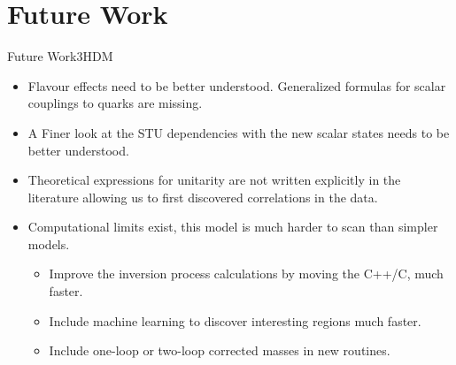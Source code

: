 \documentclass[10pt,xcolor=dvipsnames,mathserif]{beamer}
\begin{document}
\begin{frame}
\end{frame}



\section{Future Work}

\begin{frame}{Future Work}{3HDM}
\begin{itemize}
    \item Flavour effects need to be better understood. Generalized formulas for scalar couplings to quarks are missing.  
    \item A Finer look at the STU dependencies with the new scalar states needs to be better understood. 
    \item Theoretical expressions for unitarity are not written explicitly in the literature allowing us to first discovered correlations in the data. 
    \item Computational limits exist, this model is much harder to scan than simpler models. 
    \begin{itemize}
    \item Improve the inversion process calculations by moving the C++/C, much faster. 
    \item Include machine learning to discover interesting regions much faster.
    \item Include one-loop or two-loop corrected masses in new routines.
    \end{itemize} 
\end{itemize}
\end{frame}
\end{document}

